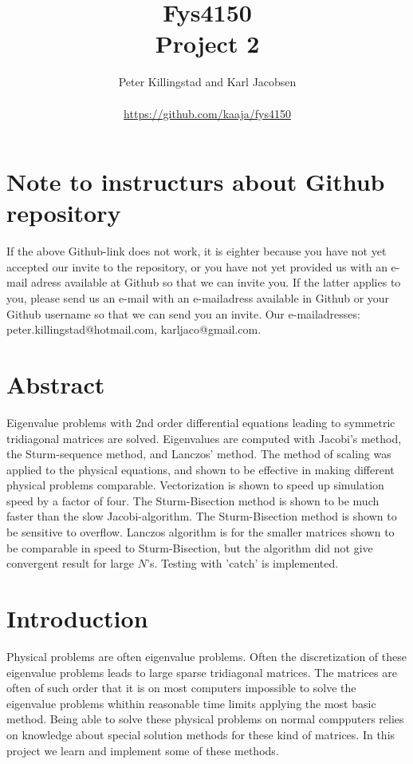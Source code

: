\documentclass{article}
\title{Fys4150\\Project 2\\ }
\author{Peter Killingstad and Karl Jacobsen\\
\\
\url{https://github.com/kaaja/fys4150}}
\begin{document}
	
\maketitle

\section*{Note to instructurs about Github repository}
If the above Github-link does not work, it is eighter because you have not yet accepted our invite to the repository, or you have not yet provided us with an e-mail adress available at Github so that we can invite you. If the latter applies to you, please send us an e-mail with an e-mailadress available in Github or your Github username so that we can send you an invite. Our e-mailadresses: peter.killingstad@hotmail.com, karljaco@gmail.com.

\section*{Abstract}
Eigenvalue problems with 2nd order differential equations leading to symmetric tridiagonal matrices are solved. Eigenvalues are computed with Jacobi's method, the Sturm-sequence method, and Lanczos' method. The method of scaling was applied to the physical equations, and shown to be effective in making different physical problems comparable.  Vectorization is shown to speed up simulation speed by a factor of four. The Sturm-Bisection method is shown to be much faster than the slow Jacobi-algorithm. The Sturm-Bisection method is shown to be sensitive to overflow. Lanczos algorithm is for the smaller matrices shown to be comparable in speed to Sturm-Bisection, but the algorithm did not give convergent result for large $N$'s. Testing with 'catch' is implemented.

\section{Introduction}
Physical problems are often eigenvalue problems. Often the discretization of these eigenvalue problems leads to large sparse tridiagonal matrices. The matrices are often of such order that it is on most computers impossible to solve the eigenvalue problems whithin reasonable time limits applying the most basic method. Being able to solve these physical problems on normal compputers relies on knowledge about special solution methods for these kind of matrices. In this project we learn and implement some of these methods.\\
\end{document}
